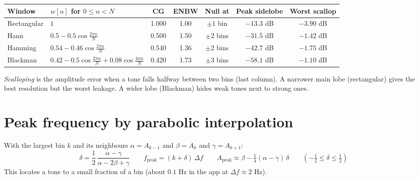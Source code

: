 \documentclass[10pt,a4paper]{article}
\newcommand{\bin}{\Delta f}
\begin{document}
\begin{center}
\begin{tabular}{@{}l l c c c c c@{}}
\toprule
Window & $w[n]$ for $0 \le n < N$ & CG & ENBW & Null at & Peak sidelobe & Worst scallop\\
\midrule
Rectangular & $1$ & 1.000 & 1.00 & $\pm 1$ bin & $-13.3$ dB & $-3.90$ dB\\
Hann & $0.5 - 0.5\cos\frac{2\pi n}{N}$ & 0.500 & 1.50 & $\pm 2$ bins & $-31.5$ dB & $-1.42$ dB\\
Hamming & $0.54 - 0.46\cos\frac{2\pi n}{N}$ & 0.540 & 1.36 & $\pm 2$ bins & $-42.7$ dB & $-1.75$ dB\\
Blackman & $0.42 - 0.5\cos\frac{2\pi n}{N} + 0.08\cos\frac{4\pi n}{N}$ & 0.420 & 1.73 & $\pm 3$ bins & $-58.1$ dB & $-1.10$ dB\\
\bottomrule
\end{tabular}
\end{center}
\emph{Scalloping} is the amplitude error when a tone falls halfway between two bins (last column). A narrower main lobe (rectangular) gives the best resolution but the worst leakage. A wider lobe (Blackman) hides weak tones next to strong ones.

\section{Peak frequency by parabolic interpolation}
With the largest bin $k$ and its neighbours $\alpha = A_{k-1}$ and $\beta = A_k$ and $\gamma = A_{k+1}$:
\[
\delta = \frac{1}{2}\,\frac{\alpha - \gamma}{\alpha - 2\beta + \gamma}
\qquad
f_{\mathrm{peak}} = (k + \delta)\,\bin
\qquad
A_{\mathrm{peak}} \approx \beta - \tfrac{1}{4}(\alpha - \gamma)\,\delta
\qquad (-\tfrac12 \le \delta \le \tfrac12)
\]
This locates a tone to a small fraction of a bin (about $0.1$ Hz in the app at $\bin \approx 2$ Hz).

\clearpage
\end{document}
